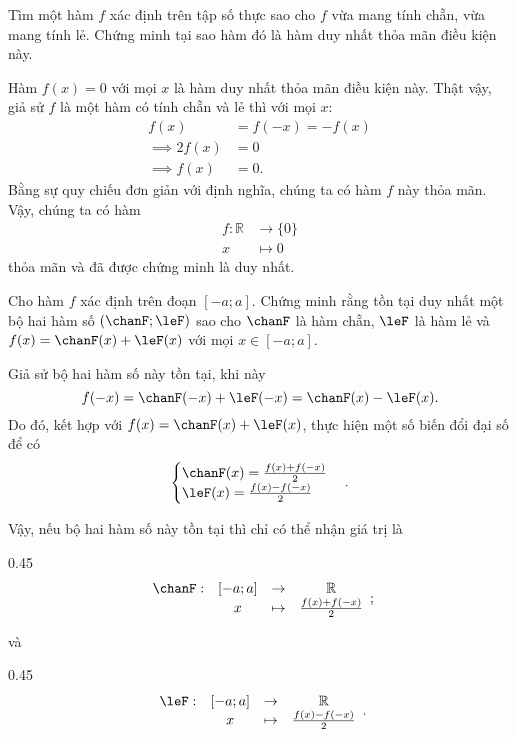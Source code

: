 \exercise Tìm một hàm $f$ xác định trên tập số thực sao cho $f$ vừa mang tính chẵn, vừa mang tính lẻ. Chứng minh tại sao hàm đó là hàm duy nhất thỏa mãn điều kiện này.

\solution 

Hàm $f(x) = 0$ với mọi $x$ là hàm duy nhất thỏa mãn điều kiện này. Thật vậy, giả sử $f$ là một hàm có tính chẵn và lẻ thì với mọi $x$: 
\begin{align*}
   f(x) &= f(-x) = -f(x) \\
   \implies 2f(x) &= 0 \\
   \implies f(x) &= 0.
\end{align*}
Bằng sự quy chiếu đơn giản với định nghĩa, chúng ta có hàm $f$ này thỏa mãn. Vậy, chúng ta có hàm \begin{align*}
   f: \mathbb{R} &\to \{0\} \\
         x &\mapsto 0
\end{align*} thỏa mãn và đã được chứng minh là duy nhất.

\exercise Cho hàm $f$ xác định trên đoạn $[-a; a]$. Chứng minh rằng tồn tại duy nhất một bộ hai hàm số $\left(\chanF; \leF\right)$ sao cho $\chanF$ là hàm chẵn, $\leF$ là hàm lẻ và $f(x) = \chanF(x) + \leF(x)$ với mọi $x \in [-a; a]$.

\solution

Giả sử bộ hai hàm số này tồn tại, khi này
$$
f(-x) = \chanF(-x) + \leF(-x) = \chanF(x) - \leF(x).
$$
Do đó, kết hợp với $f(x) = \chanF(x) + \leF(x)$, thực hiện một số biến đổi đại số để có \begin{equation*}
   \begin{cases}
      \chanF(x) = \frac{f(x) + f(-x)}{2} \\
      \leF(x) = \frac{f(x) - f(-x)}{2}
   \end{cases}.
\end{equation*}

Vậy, nếu bộ hai hàm số này tồn tại thì chỉ có thể nhận giá trị là

{
   \begin{minipageindent}{0.45\textwidth}
      \begin{equation*}
         \begin{array}{rccc}
            \chanF: &[-a; a] &\to &\mathbb{R} \\
            &x &\mapsto &\frac{f(x) + f(-x)}{2}
         \end{array};
      \end{equation*}
   \end{minipageindent}
   và 
   \begin{minipageindent}{0.45\textwidth}
      \begin{equation*}
         \begin{array}{rccc}
            \leF: &[-a; a] &\to &\mathbb{R} \\
            &x &\mapsto &\frac{f(x) - f(-x)}{2}
         \end{array}.
      \end{equation*}
   \end{minipageindent}
}

